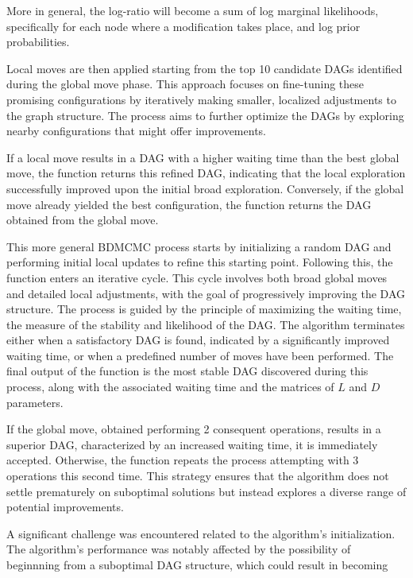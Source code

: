 \documentclass{report}
\begin{document}
More in general, the log-ratio will become a sum of log marginal likelihoods, specifically for each node where a modification takes place, and log prior probabilities.

Local moves are then applied starting from the top 10 candidate DAGs identified during the global move phase. This approach focuses on fine-tuning these promising configurations by iteratively making smaller, localized adjustments to the graph structure. The process aims to further optimize the DAGs by exploring nearby configurations that might offer improvements. 

If a local move results in a DAG with a higher waiting time than the best global move, the function returns this refined DAG, indicating that the local exploration successfully improved upon the initial broad exploration. Conversely, if the global move already yielded the best configuration, the function returns the DAG obtained from the global move. \hfill \break

This more general BDMCMC process starts by initializing a random DAG and performing initial local updates to refine this starting point. Following this, the function enters an iterative cycle. This cycle involves both broad global moves and detailed local adjustments, with the goal of progressively improving the DAG structure. The process is guided by the principle of maximizing the waiting time, the measure of the stability and likelihood of the DAG. The algorithm terminates either when a satisfactory DAG is found, indicated by a significantly improved waiting time, or when a predefined number of moves have been performed. The final output of the function is the most stable DAG discovered during this process, along with the associated waiting time and the matrices of $L$ and $D$ parameters. 

If the global move, obtained performing 2 consequent operations, results in a superior DAG, characterized by an increased waiting time, it is immediately accepted. Otherwise, the function repeats the process attempting with 3 operations this second time. 
This strategy ensures that the algorithm does not settle prematurely on suboptimal solutions but instead explores a diverse range of potential improvements. 

A significant challenge was encountered related to the algorithm's initialization. The algorithm's performance was notably affected by the possibility of beginnning from a suboptimal DAG structure, which could result in becoming 
\end{document}
